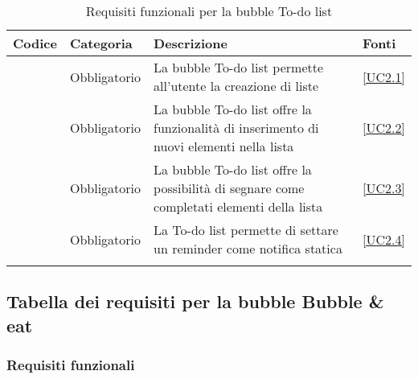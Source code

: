 \begin{longtable}{|P{1.5cm}|P{2.5cm}|P{6.5cm}|P{2.5cm}|}
	\hline \textbf{Codice} & \textbf{Categoria} & \textbf{Descrizione} & \textbf{Fonti} \\
	\hline \RequisitoObF\label{L17} & Obbligatorio & La bubble To-do list permette all'utente la creazione di liste & \ref{UC2.1} \\
	\hline \RequisitoObF\label{L18} & Obbligatorio & La bubble To-do list offre la funzionalità di inserimento di nuovi elementi nella lista & \ref{UC2.2} \\
	\hline \RequisitoObF\label{L19} & Obbligatorio & La bubble To-do list offre la possibilità di segnare come completati elementi della lista & \ref{UC2.3} \\
	\hline \RequisitoObF\label{L20} & Obbligatorio & La To-do list permette di settare un reminder come notifica statica & \ref{UC2.4} \\
	\hline
	\caption{Requisiti funzionali per la bubble To-do list}
\end{longtable}

\subsection{Tabella dei requisiti per la bubble Bubble \& eat}

\subsubsection{Requisiti funzionali}

